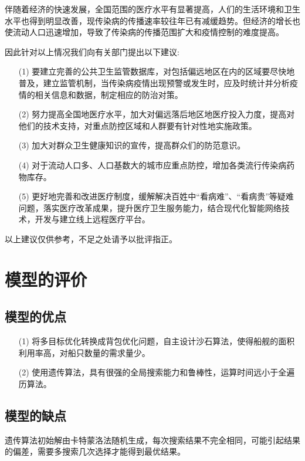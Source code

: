 \documentclass{whutmod}
\begin{document}
    伴随着经济的快速发展，全国范围的医疗水平有显著提高，人们的生活环境和卫生水平也得到明显改善，现传染病的传播速率较往年已有减缓趋势。但经济的增长也使流动人口迅速增加，导致了传染病的传播范围扩大和疫情控制的难度提高。 
    
    因此针对以上情况我们向有关部门提出以下建议:
    \begin{itemize}                                             
    	\item [(1)] 要建立完善的公共卫生监管数据库，对包括偏远地区在内的区域要尽快地普及，建立监管机制，当传染病疫情出现预警或发生时，应及时统计并分析疫情的相关信息和数据，制定相应的防治对策。
    	\item[(2)]努力提高全国地医疗水平，加大对偏远落后地区地医疗投入力度，提高对他们的技术支持，对重点防控区域和人群要有针对性地实施政策。
    	\item [(3)]加大对群众卫生健康知识的宣传，提高群众们的防范意识。
    	\item [(4)]对于流动人口多、人口基数大的城市应重点防控，增加各类流行传染病药物库存。
    	\item [(5)]更好地完善和改进医疗制度，缓解解决百姓中“看病难”、“看病贵”等疑难问题，落实医疗改革成果，提升医疗卫生服务能力，结合现代化智能网络技术，开发与建立线上远程医疗平台。	
    \end{itemize}
	以上建议仅供参考，不足之处请予以批评指正。


	\section{模型的评价}
	
	\subsection{模型的优点}
		\begin{itemize}                                             

		\item [(1)] 将多目标优化转换成背包优化问题，自主设计沙石算法，使得船舰的面积利用率高，对船只数量的需求量少。
		\item [(2)] 使用遗传算法，具有很强的全局搜索能力和鲁棒性，运算时间远小于全遍历算法。
	\end{itemize}
	\subsection{模型的缺点}
	
	遗传算法初始解由卡特蒙洛法随机生成，每次搜索结果不完全相同，可能引起结果的偏差，需要多搜索几次选择才能得到最优结果。
\end{document}
